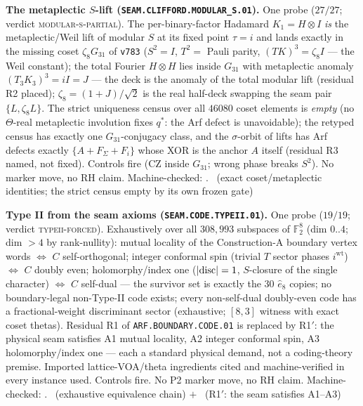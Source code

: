 \documentclass[11pt,a4paper]{article}
\theoremstyle{definition}
\begin{document}
\par\smallskip\noindent\textbf{The metaplectic $S$-lift
(\texttt{SEAM.CLIFFORD.MODULAR\_S.01}).}
One probe ($27/27$; verdict \textsc{modular-s-partial}).  The
per-binary-factor Hadamard $K_1=H\otimes I$ \emph{is} the
metaplectic/Weil lift of modular $S$ at its fixed point $\tau=i$ and
lands exactly in the missing coset $\zeta_8G_{31}$ of \texttt{v783}
($S^2=I$, $T^2=$ Pauli parity, $(TK)^3=\zeta_8 I$ --- the Weil
constant); the total Fourier $H\otimes H$ lies inside $G_{31}$ with
metaplectic anomaly $(T_3K_3)^3=iI=J$ --- the deck is the anomaly of
the total modular lift (residual R2 placed); $\zeta_8=(1{+}J)/\sqrt2$
is the real half-deck swapping the seam pair $\{L,\zeta_8L\}$.  The
strict uniqueness census over all $46080$ coset elements is
\emph{empty} (no $\Theta$-real metaplectic involution fixes
$q^{*}$: the Arf defect is unavoidable); the retyped census has
exactly one $G_{31}$-conjugacy class, and the $\sigma$-orbit of
lifts has Arf defects exactly $\{A+F_{\Sigma}+F_i\}$ whose XOR is
the anchor $A$ itself (residual R3 named, not fixed).  Controls fire
(CZ inside $G_{31}$; wrong phase breaks $S^2$).  No marker move, no
RH claim.
Machine-checked: .
\mE\ (exact coset/metaplectic identities; the strict census empty by
its own frozen gate)
\par\smallskip

\par\smallskip\noindent\textbf{Type II from the seam axioms
(\texttt{SEAM.CODE.TYPEII.01}).}
One probe ($19/19$; verdict \textsc{typeii-forced}).  Exhaustively
over all $308{,}993$ subspaces of $\mathbb F_2^8$ (dim $0..4$;
dim $>4$ by rank-nullity): mutual locality of the Construction-A
boundary vertex words $\iff$ $C$ self-orthogonal; integer conformal
spin (trivial $T$ sector phases $i^{\mathrm{wt}}$) $\iff$ $C$ doubly
even; holomorphy/index one ($|{\rm disc}|=1$, $S$-closure of the
single character) $\iff$ $C$ self-dual --- the survivor set is
exactly the $30$ $\hat e_8$ copies; no boundary-legal non-Type-II
code exists; every non-self-dual doubly-even code has a
fractional-weight discriminant sector (exhaustive; $[8,3]$ witness
with exact coset thetas).  Residual R1 of
\texttt{ARF.BOUNDARY.CODE.01} is replaced by R1$'$: the physical
seam satisfies A1 mutual locality, A2 integer conformal spin, A3
holomorphy/index one --- each a standard physical demand, not a
coding-theory premise.  Imported lattice-VOA/theta ingredients
cited and machine-verified in every instance used.  Controls fire.
No P2 marker move, no RH claim.
Machine-checked: .
\mE\ (exhaustive equivalence chain) $+$ \mC\ (R1$'$: the seam
satisfies A1--A3)
\par\smallskip
\end{document}
